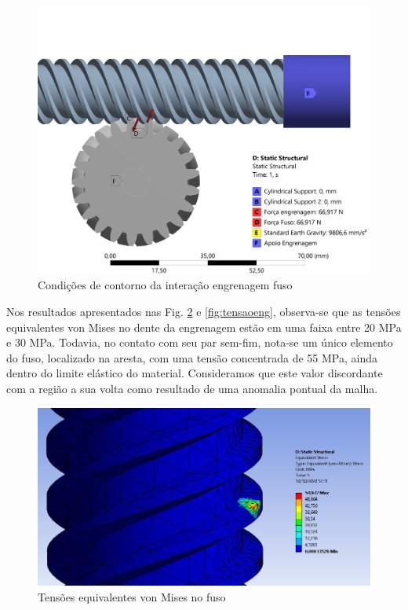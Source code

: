 \begin{figure}[ht]
        \centering
        \includegraphics[width=.9\textwidth]{figuras/estrutura/InteracaoFusoEng/PC3 Condicao de contorno.png}
        \caption{Condições de contorno da interação engrenagem fuso}
        \label{fig:condcontorno}
    \end{figure}

Nos resultados apresentados nas Fig. \ref{fig:tensaofuso} e \ref{fig:tensaoeng}, observa-se que as tensões equivalentes von Mises no dente da engrenagem estão em uma faixa entre 20 MPa e 30 MPa. Todavia, no contato com seu par sem-fim, nota-se um único elemento do fuso, localizado na aresta, com uma tensão concentrada de 55 MPa, ainda dentro do limite elástico do material. Consideramos que este valor discordante com a região a sua volta como resultado de uma anomalia pontual da malha.

\begin{figure}[ht]
        \centering
        \includegraphics[width=.8\textwidth]{figuras/estrutura/InteracaoFusoEng/tensao fuso.jpeg}
        \caption{Tensões equivalentes von Mises no fuso}
        \label{fig:tensaofuso}
    \end{figure}
    
